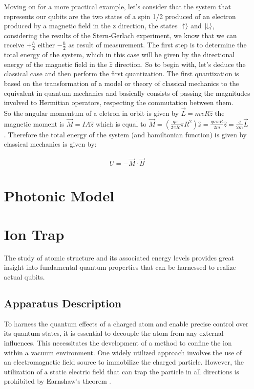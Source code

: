 \documentclass[
  journal=largetwo,
  year=2023,
]{cup-journal}
\begin{document}
Moving on for a more practical example, let's consider that the system that represents our qubits are the two states of a spin 1/2 produced of an electron produced by a magnetic field in the z direction, the states \(\ket{\uparrow}\) and \(\ket{\downarrow}\), considering the results of the Stern-Gerlach experiment, we know that we can receive \(+\frac{\hbar}{2}\)  either \(-\frac{\hbar}{2}\) as result of measurement. The first step is to determine the total energy of the system, which in this case will be given by the directional energy of the magnetic field in the \(\hat{z}\) direction. So to begin with, let's deduce the classical case and then perform the first quantization. The first quantization is based on the transformation of a model or theory of classical mechanics to the equivalent in quantum mechanics and basically consists of passing the magnitudes involved to Hermitian operators, respecting the commutation between them.\\
So the angular momentum of a eletron in orbit is given by \(\Vec{L} = mvR\hat{z}\)  the magnetic moment is \(\vec{M} = IA\hat{z}\)  which is equal to \(\vec{M} = (\frac{qv}{2\pi R}\pi R^{2})\hat{z} = \frac{qmvR}{2m}\hat{z} = \frac{q}{2m}\Vec{L}\) . Therefore the total energy of the system (and hamiltonian function) is given by classical mechanics is given by:

\begin{equation}
  \begin{aligned}\label{eq:8}
    U = -\Vec{M}\cdot\vec{B}
  \end{aligned}
\end{equation}

\section{Photonic Model}

\section{Ion Trap}
The study of atomic structure and its associated energy levels provides great insight into fundamental quantum properties that can be harnessed to realize actual qubits.

\subsection{Apparatus Description}

To harness the quantum effects of a charged atom and enable precise control over its quantum states, it is essential to decouple the atom from any external influences. This necessitates the development of a method to confine the ion within a vacuum environment. One widely utilized approach involves the use of an electromagnetic field source to immobilize the charged particle. However, the utilization of a static electric field that can trap the particle in all directions is prohibited by Earnshaw's theorem \autocite{jones_1980_earnshaws}.
\end{document}
